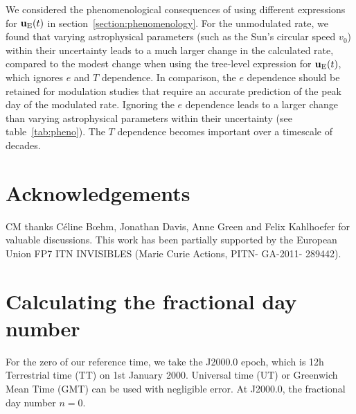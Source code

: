 \documentclass[preprintnumbers,a4paper,twocolumn,floats,nofootinbib,superscriptaddress,aps,prd]{revtex4-1}
\begin{document}
We considered the phenomenological consequences of using different expressions for $\mathbf{u}_{\rm{E}}(t)$ in section~\ref{section:phenomenology}. For the unmodulated rate, we found that varying astrophysical parameters (such as the Sun's circular speed $v_0$) within their uncertainty leads to a much larger change in the calculated rate, compared to the modest change when using the tree-level expression for $\mathbf{u}_{\rm{E}}(t)$, which ignores $e$ and $T$ dependence. In comparison, the $e$ dependence should be retained for modulation studies that require an accurate prediction of the peak day of the modulated rate. Ignoring the $e$ dependence leads to a larger change than varying astrophysical parameters within their uncertainty (see table~\ref{tab:pheno}). The $T$ dependence becomes important over a timescale of decades.

\section*{Acknowledgements}
\noindent CM thanks C\'eline B\oe hm, Jonathan Davis, Anne Green and Felix Kahlhoefer for valuable discussions. This work has been partially supported by the European Union FP7 ITN INVISIBLES (Marie Curie Actions, PITN- GA-2011- 289442).

\appendix

\section{Calculating the fractional day number}
\label{sec:epoch}
For the zero of our reference time, we take the J2000.0 epoch, which is 12h Terrestrial time (TT) on 1st January 2000. Universal time (UT) or Greenwich Mean Time (GMT) can be used with negligible error. At J2000.0, the fractional day number $n=0$.
\end{document}

